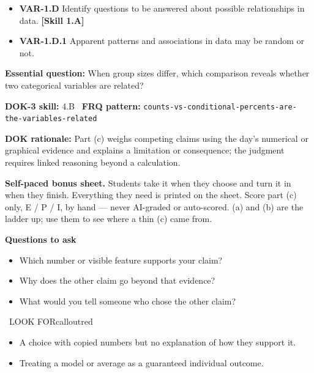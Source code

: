 \documentclass[11pt]{article}
\begin{document}


{\small
\begin{itemize}[leftmargin=1.5em,itemsep=2pt,topsep=2pt]
  \item \textbf{VAR-1.D} Identify questions to be answered about possible relationships in data. \textbf{[Skill 1.A]}
  \item \textbf{VAR-1.D.1} Apparent patterns and associations in data may be random or not.
\end{itemize}
}
\textbf{Essential question:} When group sizes differ, which comparison reveals whether two categorical variables are related?\par
\textbf{DOK-3 skill:} 4.B \textperiodcentered\ \textbf{FRQ pattern:} {\small\texttt{counts-\allowbreak{}vs-\allowbreak{}conditional-\allowbreak{}percents-\allowbreak{}are-\allowbreak{}the-\allowbreak{}variables-\allowbreak{}related}}\par
\textbf{DOK rationale:} Part (c) weighs competing claims using the day's numerical or graphical evidence and explains a limitation or consequence; the judgment requires linked reasoning beyond a calculation.\par

\textbf{Self-paced bonus sheet.} Students take it when they choose and turn it in when they finish. Everything they need is printed on the sheet. Score part (c) only, E / P / I, by hand --- never AI-graded or auto-scored. (a) and (b) are the ladder up; use them to see where a thin (c) came from.\par

\textbf{Questions to ask}
\begin{itemize}[leftmargin=1.5em,itemsep=2pt,topsep=2pt]
  \item Which number or visible feature supports your claim?
  \item Why does the other claim go beyond that evidence?
  \item What would you tell someone who chose the other claim?
\end{itemize}

\begin{callout}{\IconWarn\ LOOK FOR}{calloutred}
\begin{itemize}[leftmargin=1.5em,itemsep=2pt,topsep=2pt]
  \item A choice with copied numbers but no explanation of how they support it.
  \item Treating a model or average as a guaranteed individual outcome.
\end{itemize}
\end{callout}
\end{document}
